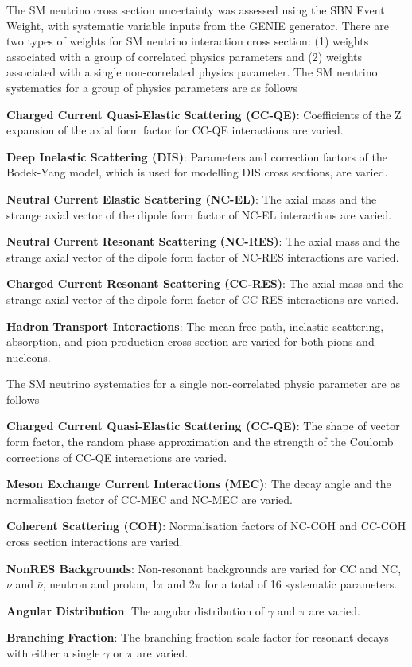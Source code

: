 The SM neutrino cross section uncertainty was assessed using the SBN Event Weight, with systematic variable inputs from the GENIE generator.
There are two types of weights for SM neutrino interaction cross section: (1) weights associated with a group of correlated physics parameters and (2) weights associated with a single non-correlated physics parameter.
The SM neutrino systematics for a group of physics parameters are as follows
\begin{coloritemize}
\item\textbf{Charged Current Quasi-Elastic Scattering (CC-QE)}: Coefficients of the Z expansion of the axial form factor for CC-QE interactions are varied.
\item\textbf{Deep Inelastic Scattering (DIS)}: Parameters and correction factors of the Bodek-Yang model, which is used for modelling DIS cross sections, are varied. 
\item\textbf{Neutral Current Elastic Scattering (NC-EL)}: The axial mass and the strange axial vector of the dipole form factor of NC-EL interactions are varied.
\item\textbf{Neutral Current Resonant Scattering (NC-RES)}: The axial mass and the strange axial vector of the dipole form factor of NC-RES interactions are varied.
\item\textbf{Charged Current Resonant Scattering (CC-RES)}: The axial mass and the strange axial vector of the dipole form factor of CC-RES interactions are varied.
\item\textbf{Hadron Transport Interactions}: The mean free path, inelastic scattering, absorption, and pion production cross section are varied for both pions and nucleons.
\end{coloritemize}
The SM neutrino systematics for a single non-correlated physic parameter are as follows
\begin{coloritemize}
\item\textbf{Charged Current Quasi-Elastic Scattering (CC-QE)}: The shape of vector form factor, the random phase approximation and the strength of the Coulomb corrections of CC-QE interactions are varied.
\item\textbf{Meson Exchange Current Interactions (MEC)}: The decay angle and the normalisation factor of CC-MEC and NC-MEC are varied.
\item\textbf{Coherent Scattering (COH)}: Normalisation factors of NC-COH and CC-COH cross section interactions are varied.
\item\textbf{NonRES Backgrounds}: Non-resonant backgrounds are varied for CC and NC, $\nu$ and $\bar{\nu}$, neutron and proton, 1$\pi$ and 2$\pi$ for a total of 16 systematic parameters.
\item\textbf{Angular Distribution}: The angular distribution of $\gamma$ and $\pi$ are varied.
\item\textbf{Branching Fraction}: The branching fraction scale factor for resonant  decays with either a single $\gamma$ or $\pi$ are varied.
\end{coloritemize}
